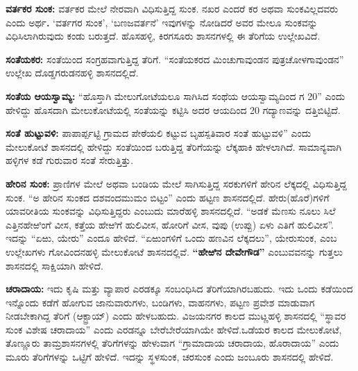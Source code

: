 \textbf{ವರ್ತಕರ ಸುಂಕ:} ವರ್ತಕರ ಮೇಲೆ ನೇರವಾಗಿ ವಿಧಿಸುತ್ತಿದ್ದ ಸುಂಕ. ನಖರ ಎಂದರೆ ಕರ ಅಥವಾ ಸುಂಕವಿಲ್ಲದವರು ಎಂದು ಅರ್ಥ\textbf{. }‘ವರ್ತಗರ ಸುಂಕ’, ‘ಬಣಜವರ್ತನೆ’ ಇವುಗಳನ್ನು ನೋಡಿದರೆ ಅವರ ಮೇಲೂ ಸುಂಕವನ್ನು ವಿಧಿಸಿಲಾಗಿರುವುದು ಕಂಡು ಬರುತ್ತದೆ. ಹೊಸಹಳ್ಳಿ, ಕಿರಗಸೂರು ಶಾಸನಗಳಲ್ಲಿ ಈ ತೆರಿಗೆಯ ಉಲ್ಲೇಖವಿದೆ.

\textbf{ಸಂತೆಯಕರ:} ಸಂತೆಯಿಂದ ಸಂಗ್ರಹವಾಗುತ್ತಿದ್ದ ತೆರಿಗೆ. “ಸಂತೆಯಕರದ ಮಿಂಚುಗಾವುಂಡನ ಪುತ್ರ\break ಚೋಳಗಾವುಂಡನ” ಉಲ್ಲೇಖ ದೊಡ್ಡಗರುಡನಹಳ್ಳಿ ಶಾಸನದಲ್ಲಿದೆ.

\textbf{ಸಂತೆಯ ಆಯಸ್ವಾಮ್ಯ:} “ಹೊಸ್ತಾಗಿ ಮೇಲುಗೋಟೆಯಲೂ ಸಾಗಿಸಿದ ಸಂಥೆಯ ಆಯಸ್ವಾಮ್ಯದಿಂದ ಗ 20” ಎಂದು ಹೇಳಿದ್ದು ಹೊಸದಾಗಿ ಮೇಲುಕೋಟೆಯಲ್ಲಿ ಸಂತೆಯನ್ನು ಕಟ್ಟಿಸಿ ಅದರ ಆಯದಿಂದ 20 ಗದ್ಯಾಣವನ್ನು ದತ್ತಿಬಿಟ್ಟಿದೆ.

\textbf{ಸಂತೆ ಹುಟ್ಟುವಳಿ:} ಪಾಪಾರ್ಪ್ಪಟ್ಟಿ ಗ್ರಾಮದ ಪೇಠೆಯಲಿ ಕಟ್ಟುವ ಬೃಹಸ್ಪತಿವಾರ ಸಂತೆ ಹುಟ್ಟುವಳಿ” ಎಂದು ಮೇಲುಕೋಟೆ ಶಾಸನದಲ್ಲಿ ಹೇಳಿದ್ದು ಸಂತೆಯಿಂದ ಬರುತ್ತಿದ್ದ ತೆರಿಗೆಯನ್ನು ಲೆಕ್ಕಹಾಕಿ ಹೇಳಲಾಗಿದೆ. ಸಾಮಾನ್ಯವಾಗಿ ಹಳ್ಳಿಗಳ ಕಡೆ ಗುರುವಾರ ಸಂತೆ ಸೇರುತ್ತಿತ್ತು.

\textbf{ಹೇರಿನ ಸುಂಕ:} ಪ್ರಾಣಿಗಳ ಮೇಲೆ ಅಥವಾ ಬಂಡಿಯ ಮೇಲೆ ಸಾಗಿಸುತ್ತಿದ್ದ ಸರಕುಗಳಿಗೆ ಹೇರಿನ ಲೆಕ್ಕದಲ್ಲಿ ವಿಧಿಸುತ್ತಿದ್ದ ಸುಂಕ. “ಅ ಹೇರಿನ ಸುಂಕದ ದಶವಂದಮುಮಂ ಬಿಟ್ಟಂ” ಎಂದು ಹಟ್ಟಣ ಶಾಸನದಲ್ಲಿದೆ. ಹೇರು(ಹೊರೆ)ಗಳಿಗೆ ಯಾವರೀತಿಯ ಸುಂಕವನ್ನು ವಿಧಿಸುತ್ತಿದ್ದರು ಎಂಬುದು ಮಾರೆಹಳ್ಳಿ ಶಾಸನದಲ್ಲಿದೆ. “ಅಡಕೆ ಮೆಣಸು ನೂಲು ಸಿಲೆ ಎತ್ತಿನಹೇಱಿಂಗೆ ವೀಸ, ಕತ್ತೆಯ ಹೇಱಿಗೆ ಹುಲಿವೀಸ, ಹೋರಿಗೆ ವೀಸ, ವುಪು (ಉಪ್ಪು) ಏಳು ಎತಿಗೆ ಹುಲಿವೀಸ”. ಇದನ್ನು “ಏಱು, ಯೇರು” ಎಂದೂ ಹೇಳಿದೆ. “ಏಱುಂಗಳಿಗೆ ಒಂದು ಹಣವಿನ ಲೆಕ್ಕದಲು”, ಯೇರುಸುಂಕ, ಎಂಬ ಉಲ್ಲೇಖಗಳು ಗೋವಿಂದನಹಳ್ಳಿ ಮೇಲುಕೋಟೆ ಶಾಸನದಲ್ಲಿವೆ. \textbf{“ಹೇಱಿನ ದೇವೇಗೌಡ”} ಎಂಬುವವನನ್ನು ಗುತ್ತಲು ಶಾಸನದಲ್ಲಿ ಸಾಕ್ಷಿಯಾಗಿ ಹೇಳಿದೆ.

\textbf{ಚರಾದಾಯ:} ಇದು ಕೃಷಿ ಮತ್ತು ವ್ಯಾಪಾರ ಎರಡಕ್ಕೂ ಸಂಬಂಧಿಸಿದ ತೆರಿಗೆಯಾಗಿರಬಹುದು. ಇದು ಒಂದು ಕಡೆಯಿಂದ ಇನ್ನೊಂದು ಕಡೆಗೆ ಹೋಗುವ ಜಾನುವಾರುಗಳು, ಬಂಡಿಗಳು, ವಾಹನಗಳು, ಪಟ್ಟಣ ಪ್ರವೇಶ ಮಾಡುವಾಗ ನೀಡಬೇಕಾಗಿದ್ದ ತೆರಿಗೆ (ಆಕ್ಟ್ರಾಯ್​) ಎಂದು ಹೇಳಬಹುದು. ವಿಜಯನಗರ ಕಾಲದ ಮುಟ್ಣಹಳ್ಳಿ ಶಾಸನದಲ್ಲಿ “ಸ್ಥಾವರ ಸುಂಕ ವಿಶೇಷ ಚರಾದಾಯ” ಎಂದು ಎರಡನ್ನೂ ಬೇರೆಬೇರೆಯಾಗಿಯೇ ಹೇಳಿದೆ.ಒಡೆಯರ ಕಾಲದ ಮೇಲುಕೋಟೆ, ತೊಣ್ಣೂರು ತಾಮ್ರಶಾಸನಗಳಲ್ಲಿ ತೆರಿಗೆಗಳನ್ನು ಹೇಳುವಾಗ “ಗ್ರಾಮಾದಾಯ ಚರಾದಾಯ, ಹೊರಾದಾಯ” ಎಂದು ಮೂರು ತೆರಿಗೆಗಳನ್ನು ಒಟ್ಟಿಗೆ ಹೇಳಿದೆ. ಇದನ್ನು ಸ್ಥಳಸುಂಕ, ಚರಸುಂಕ ಎಂದು ಜಂಬೂರು ಶಾಸನದಲ್ಲಿ ಹೇಳಿದೆ.

